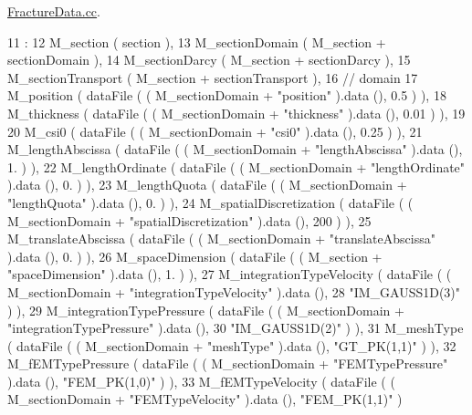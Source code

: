 \hyperlink{FractureData_8cc}{Fracture\-Data.\-cc}. 


\begin{DoxyCode}
11                                                                  :
12             M\_section ( section ),
13             M\_sectionDomain ( M\_section + sectionDomain ),
14             M\_sectionDarcy ( M\_section + sectionDarcy ),
15             M\_sectionTransport ( M\_section + sectionTransport ),
16             \textcolor{comment}{// domain}
17             M\_position ( dataFile ( ( M\_sectionDomain + \textcolor{stringliteral}{"position"} ).data (), 0.5 ) ),
18             M\_thickness ( dataFile ( ( M\_sectionDomain + \textcolor{stringliteral}{"thickness"} ).data (), 0.01 ) ),
19 
20             M\_csi0 ( dataFile ( ( M\_sectionDomain + \textcolor{stringliteral}{"csi0"} ).data (), 0.25 ) ),
21             M\_lengthAbscissa ( dataFile ( ( M\_sectionDomain + \textcolor{stringliteral}{"lengthAbscissa"} ).data (), 1. ) ),
22             M\_lengthOrdinate ( dataFile ( ( M\_sectionDomain + \textcolor{stringliteral}{"lengthOrdinate"} ).data (), 0. ) ),
23             M\_lengthQuota ( dataFile ( ( M\_sectionDomain + \textcolor{stringliteral}{"lengthQuota"} ).data (), 0. ) ),
24             M\_spatialDiscretization ( dataFile ( ( M\_sectionDomain + \textcolor{stringliteral}{"spatialDiscretization"} ).data (), 200
       ) ),
25             M\_translateAbscissa ( dataFile ( ( M\_sectionDomain + \textcolor{stringliteral}{"translateAbscissa"} ).data (), 0. ) ),
26             M\_spaceDimension ( dataFile ( ( M\_section + \textcolor{stringliteral}{"spaceDimension"} ).data (), 1. ) ),
27             M\_integrationTypeVelocity ( dataFile ( ( M\_sectionDomain + \textcolor{stringliteral}{"integrationTypeVelocity"} ).data (),
28                                                    \textcolor{stringliteral}{"IM\_GAUSS1D(3)"} ) ),
29             M\_integrationTypePressure ( dataFile ( ( M\_sectionDomain + \textcolor{stringliteral}{"integrationTypePressure"} ).data (),
30                                                    \textcolor{stringliteral}{"IM\_GAUSS1D(2)"} ) ),
31             M\_meshType ( dataFile ( ( M\_sectionDomain + \textcolor{stringliteral}{"meshType"} ).data (), \textcolor{stringliteral}{"GT\_PK(1,1)"} ) ),
32             M\_fEMTypePressure ( dataFile ( ( M\_sectionDomain + \textcolor{stringliteral}{"FEMTypePressure"} ).data (), \textcolor{stringliteral}{"FEM\_PK(1,0)"} )
       ),
33             M\_fEMTypeVelocity ( dataFile ( ( M\_sectionDomain + \textcolor{stringliteral}{"FEMTypeVelocity"} ).data (), \textcolor{stringliteral}{"FEM\_PK(1,1)"} )

\end{DoxyCode}
